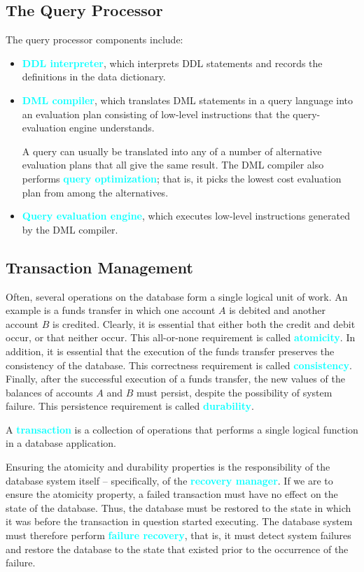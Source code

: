 \documentclass{Beautybook-EN}
\newcommand{\textcy}[1]{\textbf{\textcolor{cyan}{#1}}}
\begin{document}
\subsection{The Query Processor}

The query processor components include:
\begin{itemize}
    \item\textcy{DDL interpreter}, which interprets DDL statements and records the definitions in the data dictionary.
    \item\textcy{DML compiler}, which translates DML statements in a query language into an evaluation plan consisting of low-level instructions that the query-evaluation engine understands.
    
    \quad A query can usually be translated into any of a number of alternative evaluation plans that all give the same result. The DML compiler also performs \textcy{query optimization}; that is, it picks the lowest cost evaluation plan from among the alternatives.
    \item\textcy{Query evaluation engine}, which executes low-level instructions generated by the DML compiler.
\end{itemize}

\subsection{Transaction Management}

Often, several operations on the database form a single logical unit of work. An example is a funds transfer in which one account $A$ is debited and another account $B$ is credited. Clearly, it is essential that either both the credit and debit occur, or that neither occur. This all-or-none requirement is called \textcy{atomicity}. In addition, it is essential that the execution of the funds transfer preserves the consistency of the database. This correctness requirement is called \textcy{consistency}. Finally, after the successful execution of a funds transfer, the new values of the balances of accounts $A$ and $B$ must persist, despite the possibility of system failure. This persistence requirement is called \textcy{durability}.

A \textcy{transaction} is a collection of operations that performs a single logical function in a database application.

Ensuring the atomicity and durability properties is the responsibility of the database system itself -- specifically, of the \textcy{recovery manager}. If we are to ensure the atomicity property, a failed transaction must have no effect on the state of the database. Thus, the database must be restored to the state in which it was before the transaction in question started executing. The database system must therefore perform \textcy{failure recovery}, that is, it must detect system failures and restore the database to the state that existed prior to the occurrence of the failure.
\end{document}

